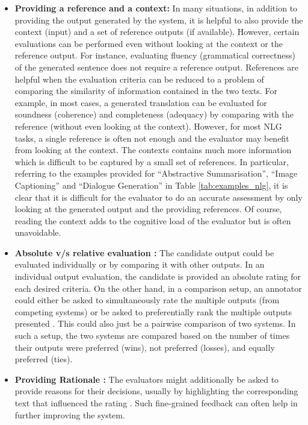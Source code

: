 \begin{itemize}
    \item \textbf{Providing a reference and a context:} In many situations, in addition to providing the output generated by the system, it is helpful to also provide the context (input) and a set of reference outputs (if available). However, certain evaluations can be performed even without looking at the context or the reference output. For instance, evaluating fluency (grammatical correctness) of the generated sentence does not require a reference output. References are helpful when the evaluation criteria can be reduced to a problem of comparing the similarity of information contained in the two texts. For example, in most cases, a generated translation can be evaluated for soundness (coherence) and completeness (adequacy) by comparing with the reference (without even looking at the context). However, for most NLG tasks, a single reference is often not enough and the evaluator may benefit from looking at the context. The contexts contains much more information which is difficult to be captured by a small set of references. In particular, referring to the examples provided for ``Abstractive Summarisation'', ``Image Captioning'' and ``Dialogue Generation'' in Table \ref{tab:examples_nlg}, it is clear that it is difficult for the evaluator to do an accurate assessment by only looking at the generated output and the providing references. Of course, reading the context adds to the cognitive load of the evaluator but is often unavoidable. 
    \item \textbf{Absolute v/s relative evaluation :} The candidate output could be evaluated individually or by comparing it with other outputs. In an individual output evaluation, the candidate is provided an absolute rating for each desired criteria. On the other hand, in a comparison setup, an annotator could either be asked to simultaneously rate the multiple outputs (from competing systems)  or be asked to preferentially rank the multiple outputs presented . 
    This could also just be a pairwise comparison  of two systems. In such a setup, 
    the two systems are compared based on the number of times their outputs were preferred (wins), not preferred (losses), and equally preferred (ties).
    \item \textbf{Providing Rationale :} The evaluators might additionally be asked to provide reasons for their decisions, usually by highlighting the corresponding text that influenced the rating . Such fine-grained feedback can often help in further improving the system. 
\end{itemize}

